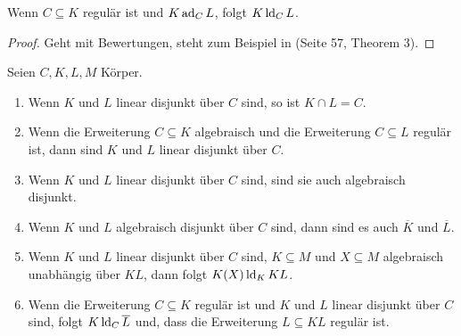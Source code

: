     \begin{lemma}\label{Das komplizierte Lemma}
    	Wenn $C\subseteq K$ regulär ist und $K\operatorname{ad}_CL$, folgt $K\operatorname{ld}_CL$.
    \end{lemma}
    \begin{proof}
    	Geht mit Bewertungen, steht zum Beispiel in \cite{SergeLang} (Seite 57, Theorem 3).
    \end{proof}
    
    \begin{lemma}\label{Rechenregeln}
    	Seien $C,K,L,M$ Körper.
    	\begin{enumerate}
    		\item Wenn $K$ und $L$ linear disjunkt über $C$ sind, so ist $K\cap L=C$.
    		\item Wenn die Erweiterung $C\subseteq K$ algebraisch und die Erweiterung $C\subseteq L$ regulär ist, dann sind $K$ und $L$ linear disjunkt über $C$.
    		\item Wenn $K$ und $L$ linear disjunkt über $C$ sind, sind sie auch algebraisch disjunkt.
    		\item Wenn $K$ und $L$ algebraisch disjunkt über $C$ sind, dann sind es auch $\overline{K}$ und $\overline{L}$.
    		\item Wenn $K$ und $L$ linear disjunkt über $C$ sind, $K\subseteq M$ und $X\subseteq M$ algebraisch unabhängig über $KL$, dann folgt $K(X)\operatorname{ld}_KKL$.
    		\item Wenn die Erweiterung $C\subseteq K$ regulär ist und $K$ und $L$ linear disjunkt über $C$ sind, folgt $K\operatorname{ld}_C\overline{L}$ und, dass die Erweiterung $L\subseteq KL$ regulär ist.
    	\end{enumerate}
    \end{lemma}
